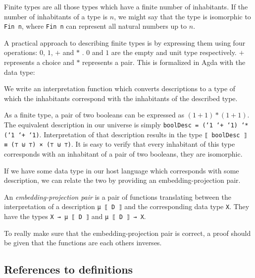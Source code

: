 Finite types are all those types which have a finite number of
inhabitants.
If the number of inhabitants of a type is $n$, we might say that the
type is isomorphic to \texttt{Fin n}, where \texttt{Fin n} can
represent all natural numbers up to $n$.

A practical approach to describing finite types is by expressing them
using four operations: $0$, $1$, $+$ and $*$ \cite{altenkirch06}.
$0$ and $1$ are the empty and unit type respectively.
$+$ represents a choice and $*$ represents a pair.
This is formalized in Agda with the  data type:


We write an interpretation function which converts descriptions to a
type of which the inhabitants correspond with the inhabitants of the
described type.


\begin{example}
As a finite type, a pair of two booleans can be expressed as $(1 + 1)
* (1 + 1)$.
The equivalent description in our universe is simply \texttt{boolDesc
  = (`1 `+ `1) `* (`1 `+ `1)}.
Interpretation of that description results in the type
\texttt{⟦ boolDesc ⟧ ≡ (⊤ ⊎ ⊤) × (⊤ ⊎ ⊤)}.
It is easy to verify that every inhabitant of this type corresponds
with an inhabitant of a pair of two booleans, they are isomorphic.
\end{example}

If we have some data type in our host language which corresponds with
some description, we can relate the two by providing an
embedding-projection pair.

\begin{definition}
  An \emph{embedding-projection pair} is a pair of functions
  translating between the interpretation of a description \texttt{μ ⟦
    D ⟧} and the corresponding data type \texttt{X}.
  They have the types \texttt{X → μ ⟦ D ⟧} and \texttt{μ ⟦ D ⟧ → X}.
\end{definition}

To really make sure that the embedding-projection pair is correct, a
proof should be given that the functions are each others inverses.

\subsection{References to definitions}

